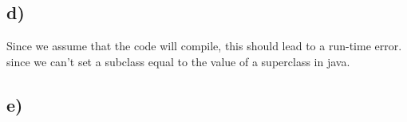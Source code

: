\subsection{d)}
Since we assume that the code will compile, this should lead to a run-time error.
since we can't set a subclass equal to the value of a superclass in java.

\subsection{e)}


